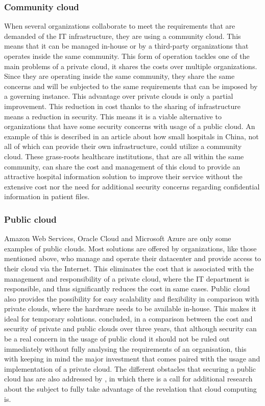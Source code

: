 \subsubsection{Community cloud}
When several organizations collaborate to meet the requirements that are demanded of the IT infrastructure, they are using a community cloud. This means that it can be managed in-house or by a third-party organizations that operates inside the same community. This form of operation tackles one of the main problems of a private cloud, it shares the costs over multiple organizations. Since they are operating inside the same community, they share the same concerns and will be subjected to the same requirements that can be imposed by a governing instance. 
This advantage over private clouds is only a partial improvement. This reduction in cost thanks to the sharing of infrastructure means a reduction in security. This means it is a viable alternative to  organizations that have some security concerns with usage of a public cloud. 
\newline
An example of this is described in an article \autocite{Yao2014} about how small hospitals in China, not all of which can provide their own infrastructure, could utilize a community cloud. These grass-roots healthcare institutions, that are all within the same community, can share the cost and management of this cloud to provide an attractive hospital information solution to improve their service without the extensive cost nor the need for additional security concerns regarding confidential information in patient files.

\subsubsection{Public cloud}
Amazon Web Services, Oracle Cloud and Microsoft Azure are only some examples of public clouds. Most solutions are offered by organizations, like those mentioned above, who manage and operate their datacenter and provide access to their cloud via the Internet. This eliminates the cost that is associated with the management and responsibility of a private cloud, where the IT department is responsible, and thus significantly reduces the cost in same cases. Public cloud also provides the possibility for easy scalability and flexibility in comparison with private clouds, where the hardware needs to be available in-house. This makes it ideal for temporary solutions.
\newline
\textcite{Singh2012} concluded, in a comparison between the cost and security of private and public clouds over three years, that although security can be a real concern in the usage of public cloud it should not be ruled out immediately without fully analysing the requirements of an organisation, this with keeping in mind the major investment that comes paired with the usage and implementation of a private cloud.  
The different obstacles that securing a public cloud has are also addressed by \textcite{Ren2012}, in which there is a call for additional research about the subject to fully take advantage of the revelation that cloud computing is. 

